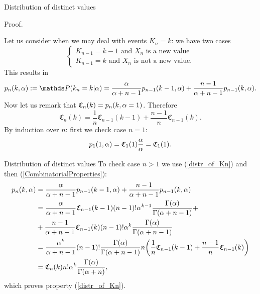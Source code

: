 \begin{frame}{Distribution of distinct values}

\alert{Proof.}

Let us consider when we may deal with events $K_n = k$: we have two cases
\begin{equation*}
    \left \{ \begin{matrix}
K_{n-1}=k-1 \text{ and } X_n \text{ is a new value}\\
K_{n-1} = k \text{ and } X_n \text{ is not a new value}.
\end{matrix}\right.
\end{equation*}
 This results in
\begin{equation}\label{CombinatorialProperties}
    p_n(k,\PrecisionParam) := \P(k_n = k|\PrecisionParam) = \frac{\PrecisionParam}{\PrecisionParam +n -1 }p_{n-1} (k-1,\PrecisionParam)+\frac{n-1}{\PrecisionParam +n -1}p_{n-1}(k,\PrecisionParam).
\end{equation}
Now let us remark that $\mathfrak{C}_n(k)=p_n(k,\alpha =1)$. Therefore
\begin{equation}\label{mathfrakC_property}
    \mathfrak{C}_n(k)=\frac 1n \mathfrak{C}_{n-1}(k-1)+\frac{n-1}{n}\mathfrak{C}_{n-1}(k).
\end{equation}
By induction over $n$: first we check case $n=1$:
\begin{equation*}
    p_1(1,\alpha)=\mathfrak{C}_1(1)\frac{\alpha}{\alpha}=\mathfrak{C}_1(1).
\end{equation*}
\end{frame}


\begin{frame}{Distribution of distinct values}
To check case $n>1$ we use (\ref{distr_of_Kn}) and then (\ref{CombinatorialProperties}):
\begin{equation*}
    \begin{split}
        p_n(k,\alpha)&=\frac{\alpha}{\alpha +n -1 }p_{n-1} (k-1,\alpha)+\frac{n-1}{\alpha +n -1}p_{n-1}(k,\alpha) \\
        &=\frac{\alpha}{\alpha +n -1 }\mathfrak{C}_{n-1}(k-1)(n-1)!\alpha^{k-1}\frac{\Gamma (\alpha)}{\Gamma(\alpha+n-1)} +\\
        &+\frac{n-1}{\alpha +n -1}\mathfrak{C}_{n-1}(k)(n-1)!\alpha^{k}\frac{\Gamma (\alpha)}{\Gamma(\alpha+n-1)}\\
        &=\frac{\alpha^k}{\alpha+n-1}(n-1)!\frac{\Gamma(\alpha)}{ \Gamma(\alpha+n-1) }n\bigg(\frac 1n \mathfrak{C}_{n-1}(k-1) + \frac{n-1}{n} \mathfrak{C}_{n-1}(k)\bigg)\\
        &=\mathfrak{C}_{n}(k)n!\alpha^k\frac{\Gamma(\alpha)}{\Gamma(\alpha+n)},
    \end{split}
\end{equation*}
which proves property (\ref{distr_of_Kn}).
\end{frame}


